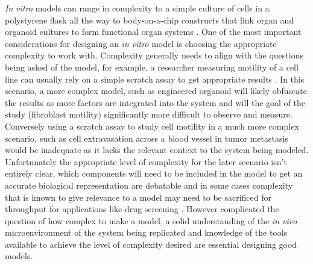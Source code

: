 \textit{In vitro} models can range in complexity to a simple culture of cells in a polystyrene flask all the way to body-on-a-chip constructs that link organ and organoid cultures to form functional organ systems \cite{Esch2011TheStudies}. One of the most important considerations for designing an \textit{in vitro} model is choosing the appropriate complexity to work with. Complexity generally needs to align with the questions being asked of the model, for example, a researcher measuring motility of a cell line can usually rely on a simple scratch assay to get appropriate results \cite{liang2007vitro}. In this scenario, a more complex model, such as engineered organoid will likely obfuscate the results as more factors are integrated into the system and will the goal of the study (fibroblast motility) significantly more difficult to observe and measure. Conversely using a scratch assay to study cell motility in a much more complex scenario, such as cell extravasation across a blood vessel in tumor metastasis would be inadequate as it lacks the relevant context to the system being modeled. Unfortunately the appropriate level of complexity for the later scenario isn't entirely clear, which components will need to be included in the model to get an accurate biological representation are debatable \cite{Bouet2015InEnvironment., davies2015capturing, stock2016capturing, Munch2000UseInteractions.} and in some cases complexity that is known to give relevance to a model may need to be sacrificed for throughput for applications like drug screening \cite{Hickman2014Three-dimensionalVivo.}. However complicated the question of how complex to make a model, a solid understanding of the \textit{in vivo} microenvironment of the system being replicated and knowledge of the tools available to achieve the level of complexity desired are essential designing good models.

